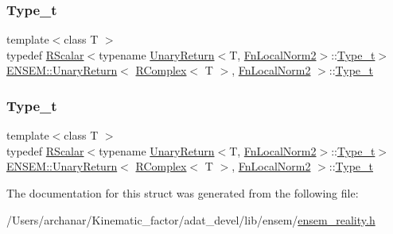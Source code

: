 \subsubsection{\texorpdfstring{Type\_t}{Type\_t}\hspace{0.1cm}{\footnotesize\ttfamily [1/2]}}
{\footnotesize\ttfamily template$<$class T $>$ \\
typedef \mbox{\hyperlink{classENSEM_1_1RScalar}{R\+Scalar}}$<$typename \mbox{\hyperlink{structENSEM_1_1UnaryReturn}{Unary\+Return}}$<$T, \mbox{\hyperlink{structENSEM_1_1FnLocalNorm2}{Fn\+Local\+Norm2}}$>$\+::\mbox{\hyperlink{structENSEM_1_1UnaryReturn_3_01RComplex_3_01T_01_4_00_01FnLocalNorm2_01_4_acf4480dbc7c87e67898043db4bd45a41}{Type\+\_\+t}}$>$ \mbox{\hyperlink{structENSEM_1_1UnaryReturn}{E\+N\+S\+E\+M\+::\+Unary\+Return}}$<$ \mbox{\hyperlink{classENSEM_1_1RComplex}{R\+Complex}}$<$ T $>$, \mbox{\hyperlink{structENSEM_1_1FnLocalNorm2}{Fn\+Local\+Norm2}} $>$\+::\mbox{\hyperlink{structENSEM_1_1UnaryReturn_3_01RComplex_3_01T_01_4_00_01FnLocalNorm2_01_4_acf4480dbc7c87e67898043db4bd45a41}{Type\+\_\+t}}}

\mbox{\label{structENSEM_1_1UnaryReturn_3_01RComplex_3_01T_01_4_00_01FnLocalNorm2_01_4_acf4480dbc7c87e67898043db4bd45a41}} 
\subsubsection{\texorpdfstring{Type\_t}{Type\_t}\hspace{0.1cm}{\footnotesize\ttfamily [2/2]}}
{\footnotesize\ttfamily template$<$class T $>$ \\
typedef \mbox{\hyperlink{classENSEM_1_1RScalar}{R\+Scalar}}$<$typename \mbox{\hyperlink{structENSEM_1_1UnaryReturn}{Unary\+Return}}$<$T, \mbox{\hyperlink{structENSEM_1_1FnLocalNorm2}{Fn\+Local\+Norm2}}$>$\+::\mbox{\hyperlink{structENSEM_1_1UnaryReturn_3_01RComplex_3_01T_01_4_00_01FnLocalNorm2_01_4_acf4480dbc7c87e67898043db4bd45a41}{Type\+\_\+t}}$>$ \mbox{\hyperlink{structENSEM_1_1UnaryReturn}{E\+N\+S\+E\+M\+::\+Unary\+Return}}$<$ \mbox{\hyperlink{classENSEM_1_1RComplex}{R\+Complex}}$<$ T $>$, \mbox{\hyperlink{structENSEM_1_1FnLocalNorm2}{Fn\+Local\+Norm2}} $>$\+::\mbox{\hyperlink{structENSEM_1_1UnaryReturn_3_01RComplex_3_01T_01_4_00_01FnLocalNorm2_01_4_acf4480dbc7c87e67898043db4bd45a41}{Type\+\_\+t}}}



The documentation for this struct was generated from the following file\+:\begin{DoxyCompactItemize}
\item 
/\+Users/archanar/\+Kinematic\+\_\+factor/adat\+\_\+devel/lib/ensem/\mbox{\hyperlink{lib_2ensem_2ensem__reality_8h}{ensem\+\_\+reality.\+h}}\end{DoxyCompactItemize}
